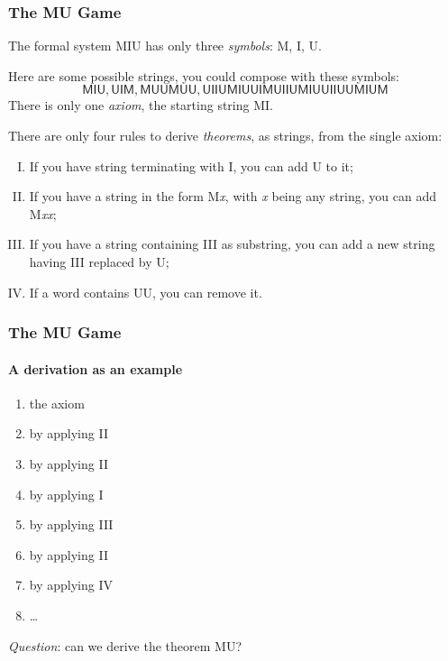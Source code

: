 \documentclass[xcolor={usenames,dvipsnames,svgnames}, compress]{beamer}
\begin{document}
\begin{frame}
  \frametitle{The MU Game}
  The formal system \textsf{MIU} has only three \emph{symbols}: \textsf{M},
  \textsf{I}, \textsf{U}.\par
  Here are some possible strings,
  you could compose with these symbols:
   $$\textsf{MIU}, \textsf{UIM}, \textsf{MUUMUU}, \textsf{UIIUMIUUIMUIIUMIUUIIUUMIUM}$$
   There is only one \emph{axiom}, the starting string
   \textsf{MI}.\par\bigskip
   
   There are only four rules to derive \emph{theorems}, as strings, from the
   single axiom:
   \begin{enumerate}[I.]
   \item If you have string terminating with \textsf{I}, you can add
     \textsf{U} to it;
   \item If you have a string in the form \textsf{M}\emph{x}, with \emph{x} being
       any string, you can add \textsf{M}\emph{xx};
     \item If you have a string containing \textsf{III} as substring,
       you can add a new string having \textsf{III} replaced by
       \textsf{U};
       \item If a word contains \textsf{UU}, you can remove it.
   \end{enumerate}\bigskip
\end{frame}

\begin{frame}
  \frametitle{The MU Game}
  \framesubtitle{A derivation as an example}
  \begin{center}
    \begin{enumerate}
    \item { the axiom}
    \item { by applying II}
    \item { by applying II}
    \item { by applying I}
    \item { by applying III}
    \item { by applying II}
    \item { by applying IV}
    \item \dots
    \end{enumerate}
  \end{center}\bigskip
  \emph{Question}: can we derive the theorem
  \textsf{MU}?\par\bigskip
  
\end{frame}
\end{document}

